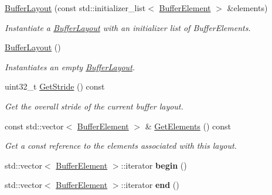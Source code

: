 \begin{DoxyCompactItemize}
\item 
\hyperlink{classengine_1_1renderer_1_1BufferLayout_aad7d69ca7a55c528fd619bc2f51635f0}{Buffer\+Layout} (const std\+::initializer\+\_\+list$<$ \hyperlink{structengine_1_1renderer_1_1BufferElement}{Buffer\+Element} $>$ \&elements)
\begin{DoxyCompactList}\small\item\em Instantiate a \hyperlink{classengine_1_1renderer_1_1BufferLayout}{Buffer\+Layout} with an initializer list of Buffer\+Elements. \end{DoxyCompactList}\item 
\mbox{\label{classengine_1_1renderer_1_1BufferLayout_ae2a3753096d6a8171179d6e9c86facb8}} 
\hyperlink{classengine_1_1renderer_1_1BufferLayout_ae2a3753096d6a8171179d6e9c86facb8}{Buffer\+Layout} ()
\begin{DoxyCompactList}\small\item\em Instantiates an empty \hyperlink{classengine_1_1renderer_1_1BufferLayout}{Buffer\+Layout}. \end{DoxyCompactList}\item 
uint32\+\_\+t \hyperlink{classengine_1_1renderer_1_1BufferLayout_abf525eed067da7cfa637c9fe795767b5}{Get\+Stride} () const
\begin{DoxyCompactList}\small\item\em Get the overall stride of the current buffer layout. \end{DoxyCompactList}\item 
\mbox{\label{classengine_1_1renderer_1_1BufferLayout_abdb110b3851f860c2d602d1b12a8568a}} 
const std\+::vector$<$ \hyperlink{structengine_1_1renderer_1_1BufferElement}{Buffer\+Element} $>$ \& \hyperlink{classengine_1_1renderer_1_1BufferLayout_abdb110b3851f860c2d602d1b12a8568a}{Get\+Elements} () const
\begin{DoxyCompactList}\small\item\em Get a const reference to the elements associated with this layout. \end{DoxyCompactList}\item 
\mbox{\label{classengine_1_1renderer_1_1BufferLayout_a8256cfd10160a6fe261a21a81a9a588d}} 
std\+::vector$<$ \hyperlink{structengine_1_1renderer_1_1BufferElement}{Buffer\+Element} $>$\+::iterator {\bfseries begin} ()
\item 
\mbox{\label{classengine_1_1renderer_1_1BufferLayout_a10e0aeab4adbb50e425d84bfd3b753a2}} 
std\+::vector$<$ \hyperlink{structengine_1_1renderer_1_1BufferElement}{Buffer\+Element} $>$\+::iterator {\bfseries end} ()
\end{DoxyCompactItemize}


